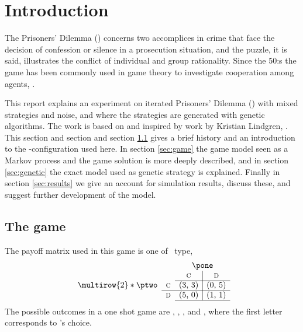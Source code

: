 \section{Introduction}\label{sec:intro}
The Prisoners' Dilemma (\pd) concerns two accomplices in crime that face the decision of confession or silence in a prosecution situation, and the puzzle, it is said, illustrates the conflict of individual and group rationality. Since the 50:s the game has been commonly used in game theory to investigate cooperation among agents, \cite{stanford:pd}.\mypar

This report explains an experiment on iterated Prisoners' Dilemma (\ipd) with mixed strategies and noise, and where the strategies are generated with genetic algorithms. The work is based on and inspired by work by Kristian Lindgren, \cite{lindgren:1991}. This section and section and section \ref{sec:intro:game} gives a brief history and an introduction to the \pd-configuration used here. In section \ref{sec:game} the game model seen as a Markov process and the game solution is more deeply described, and in section \ref{sec:genetic} the exact model used as genetic strategy is explained. Finally in section \ref{sec:results} we give an account for simulation results, discuss these, and suggest further development of the model.

\subsection{The game}\label{sec:intro:game}
The payoff matrix used in this game is one of \pd\ type,
\begin{equation}
\begin{array}{cc c|c}
		     &            & \multicolumn{2}{c}{\pone} \\
		     &            & \textsc{c} & \textsc{d}   \\ \cline{3-4}
\multirow{2}*{\ptwo} & \textsc{c} & $(3, 3)$   & $(0, 5)$     \\ \cline{2-4}
		     & \textsc{d} & $(5, 0)$   & $(1, 1)$     \\ \cline{3-4}
\end{array}
\label{equ:intro:payoff}
\end{equation}
The possible outcomes in a one shot game are , , , and , where the first letter cor\-res\-ponds to \pone's choice.\mypar

